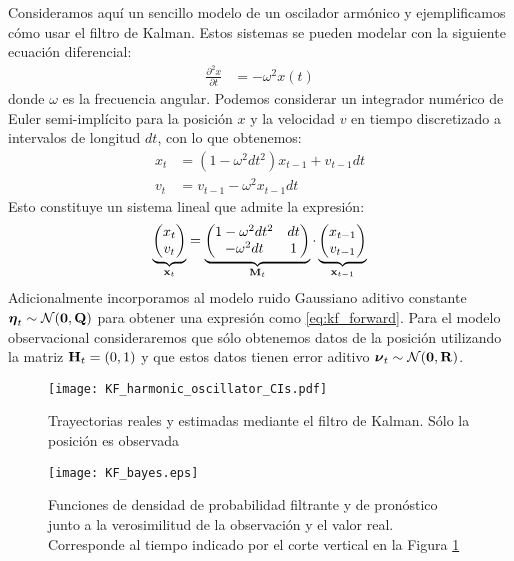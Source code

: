 Consideramos aquí un sencillo modelo de un oscilador armónico y ejemplificamos cómo usar el filtro de Kalman. Estos sistemas se pueden modelar con la siguiente ecuación diferencial:
\begin{align*}
    \frac{\partial^2 x}{\partial t} &= -\omega^2 x(t)
\end{align*}
donde $\omega$ es la frecuencia angular. Podemos considerar un integrador numérico de Euler semi-implícito para la posición $x$ y la velocidad $v$ en tiempo discretizado a intervalos de longitud $dt$, con lo que obtenemos:
\begin{align*}
    x_t &= (1 - \omega^2 dt^2) x_{t-1} + v_{t-1} dt \\
    v_t &= v_{t-1} - \omega^2 x_{t-1} dt
\end{align*}
Esto constituye un sistema lineal que admite la expresión:
\begin{align}
\underbrace{\begin{pmatrix*}
        x_t \\
        v_t
    \end{pmatrix*}}_{\v x_t} = 
\underbrace{\begin{pmatrix*}
        1 - \omega^2 dt^2 & dt \\
        -\omega^2 dt & 1
    \end{pmatrix*}}_{\v M_t} \cdot
\underbrace{\begin{pmatrix*}
        x_{t-1} \\
        v_{t-1}
    \end{pmatrix*}}_{\v x_{t-1}} \label{eq:oscillator_matrix_eq}
\end{align}
Adicionalmente incorporamos al modelo ruido Gaussiano aditivo constante $\mbox{\boldmath$ \eta $}_t \sim \mathcal{N}(\mathbf{0}, \mathbf{Q})$ para obtener una expresión como \ref{eq:kf_forward}. Para el modelo observacional consideraremos que sólo obtenemos datos de la posición utilizando la matriz $\mathbf{H}_t = (0, 1)$ y que estos datos tienen error aditivo $\mbox{\boldmath$ \nu $}_t \sim \mathcal{N}(\mathbf{0}, \mathbf{R})$.

\begin{figure}[t]
    \centering
    \texttt{[image: KF\_harmonic\_oscillator\_CIs.pdf]}
    \caption{Trayectorias reales y estimadas mediante el filtro de Kalman. Sólo la posición es observada}
    \label{fig:KF_harmonic_oscillator}
\end{figure}

\begin{figure}[h]
    \centering
    \texttt{[image: KF\_bayes.eps]}
    \caption{Funciones de densidad de probabilidad filtrante y de pronóstico junto a la verosimilitud de la observación y el valor real. Corresponde al tiempo indicado por el corte vertical en la Figura \ref{fig:KF_harmonic_oscillator}}
    \label{fig:KF_bayes}
\end{figure}

